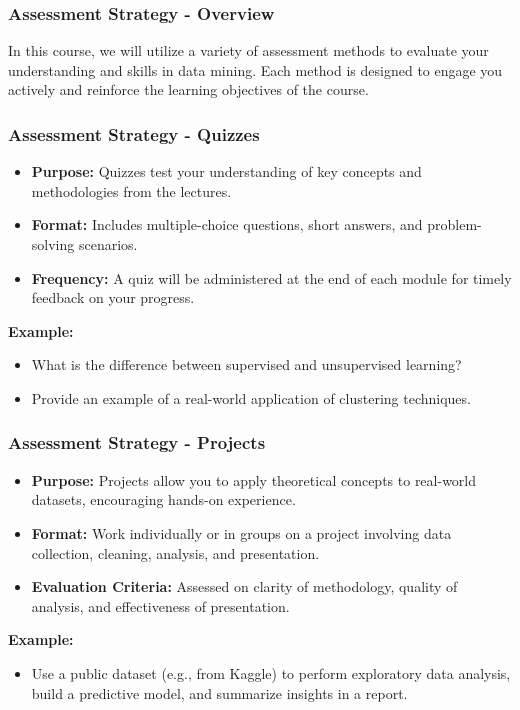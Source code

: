 \documentclass[aspectratio=169]{beamer}
\begin{document}
\begin{frame}[fragile]
  \frametitle{Assessment Strategy - Overview}
  In this course, we will utilize a variety of assessment methods to evaluate your understanding and skills in data mining. 
  Each method is designed to engage you actively and reinforce the learning objectives of the course.
\end{frame}

\begin{frame}[fragile]
  \frametitle{Assessment Strategy - Quizzes}
  \begin{itemize}
    \item \textbf{Purpose:} Quizzes test your understanding of key concepts and methodologies from the lectures.
    \item \textbf{Format:} Includes multiple-choice questions, short answers, and problem-solving scenarios.
    \item \textbf{Frequency:} A quiz will be administered at the end of each module for timely feedback on your progress.
  \end{itemize}
  
  \textbf{Example:}
  \begin{itemize}
    \item What is the difference between supervised and unsupervised learning?
    \item Provide an example of a real-world application of clustering techniques.
  \end{itemize}
\end{frame}

\begin{frame}[fragile]
  \frametitle{Assessment Strategy - Projects}
  \begin{itemize}
    \item \textbf{Purpose:} Projects allow you to apply theoretical concepts to real-world datasets, encouraging hands-on experience.
    \item \textbf{Format:} Work individually or in groups on a project involving data collection, cleaning, analysis, and presentation.
    \item \textbf{Evaluation Criteria:} Assessed on clarity of methodology, quality of analysis, and effectiveness of presentation.
  \end{itemize}
  
  \textbf{Example:} 
  \begin{itemize}
    \item Use a public dataset (e.g., from Kaggle) to perform exploratory data analysis, build a predictive model, and summarize insights in a report.
  \end{itemize}
\end{frame}
\end{document}
